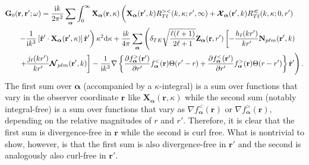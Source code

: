 \documentclass{article}
\begin{document}
\begin{equation}
\begin{split}
\mathbf{G}_0(&\mathbf{r},\mathbf{r}';\omega) = \frac{\mathrm{i}k}{2\pi^2}\sum_{\bm{\alpha}}\int_0^\infty\mathbf{X}_{\bm{\alpha}}(\mathbf{r},\kappa)\left( \vphantom{\frac{1}{4\pi k^2}} \mathbf{X}_{\bm{\alpha}}(\mathbf{r}',k)R_{T\ell}^{><}(k,\kappa;r',\infty) + \bm{\mathcal{X}}_{\bm{\alpha}}(\mathbf{r}',k)R_{T\ell}^\ll(k,\kappa;0,r')\right.\\
&\left. - \frac{1}{\mathrm{i} k^3}\left[\hat{\mathbf{r}}'\cdot\mathbf{X}_{\bm{\alpha}}(\mathbf{r}',\kappa)\right]\hat{\mathbf{r}}'\right)\kappa^2\mathrm{d}\kappa + \frac{\mathrm{i}k}{4\pi}\sum_{\bm{\alpha}}\left(\delta_{TE}\sqrt{\frac{\ell(\ell + 1)}{2\ell + 1}}\mathbf{Z}_{\bm{\alpha}}(\mathbf{r},r')\left[-\frac{h_\ell(kr')}{kr'}\mathbf{N}_{p\ell m}(\mathbf{r}',k)\right.\right.\\
&\left.\left.+ \frac{j_\ell(kr')}{kr'}\bm{\mathcal{N}}_{p\ell m}(\mathbf{r}',k)\right] -\frac{1}{\mathrm{i} k^3}\nabla\left\{\frac{\partial f_{\bm{\alpha}}^>(\mathbf{r}')}{\partial r'}f_{\bm{\alpha}}^<(\mathbf{r})\Theta(r' - r) + \frac{\partial f_{\bm{\alpha}}^<(\mathbf{r}')}{\partial r'}f_{\bm{\alpha}}^>(\mathbf{r})\Theta(r - r')\right\}\hat{\mathbf{r}}' \vphantom{\sqrt{\frac{\ell(\ell + 1)}{2\ell + 1}}} \right).
\end{split}
\end{equation}
The first sum over $\bm{\alpha}$ (accompanied by a $\kappa$-integral) is a sum over functions that vary in the observer coordinate $\mathbf{r}$ like $\mathbf{X}_{\bm{\alpha}}(\mathbf{r},\kappa)$ while the second sum (notably integral-free) is a sum over functions that vary as $\nabla f_{\bm{\alpha}}^<(\mathbf{r})$ or $\nabla f_{\bm{\alpha}}^>(\mathbf{r})$, depending on the relative magnitudes of $r$ and $r'$. Therefore, it is clear that the first sum is divergence-free in $\mathbf{r}$ while the second is curl free. What is nontrivial to show, however, is that the first sum is also divergence-free in $\mathbf{r}'$ and the second is analogously also curl-free in $\mathbf{r}'$.
\end{document}
